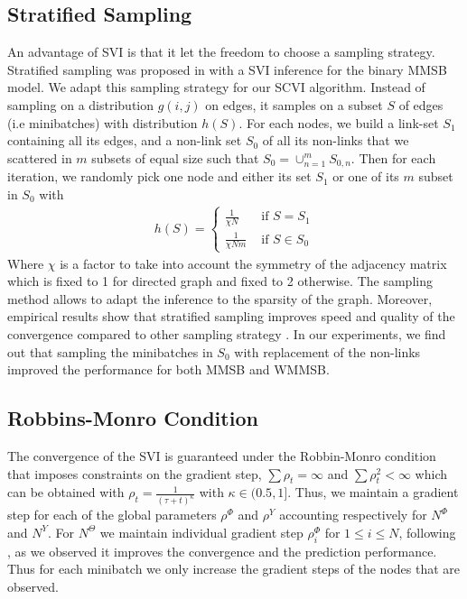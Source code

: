 \subsection{Stratified Sampling}
\label{sec:sampling}

An advantage of SVI is that it let the freedom to choose a sampling strategy. Stratified sampling was proposed in \cite{gopalan2013efficient} with a SVI inference for the binary MMSB model. We adapt this sampling strategy for our SCVI algorithm. Instead of sampling on a distribution $g(i,j)$ on edges, it samples on a subset $S$ of edges (i.e minibatches) with distribution $h(S)$. For each nodes, we build a link-set $S_1$ containing all its edges, and a non-link set $S_0$ of all its non-links that we scattered in $m$ subsets of equal size such that $S_0 = \cup_{n=1}^m S_{0,n}$. Then for each iteration, we randomly pick one node and either its set $S_1$ or one of its $m$ subset in $S_0$ with
\begin{align*}
h(S)=\begin{cases}
    \frac{1}{\chi N}  & \textrm{ if } S = S_1 \\
    \frac{1}{\chi N m}  & \textrm{ if } S \in S_0 
    \end{cases}
\end{align*}
Where $\chi$ is a factor to take into account the symmetry of the adjacency matrix which is fixed to 1 for directed graph and fixed to 2 otherwise. The sampling method allows to adapt the inference to the sparsity of the graph. Moreover, empirical results show that stratified sampling improves speed and quality of the convergence compared to other sampling strategy \cite{gopalan2013efficient}\cite{kim2013efficient}. In our experiments, we find out that sampling the minibatches in $S_0$ with replacement of the non-links improved the performance for both MMSB and WMMSB.

\subsection{Robbins-Monro Condition}

The convergence of the SVI is guaranteed under the Robbin-Monro condition \cite{robbins1951stochastic} that imposes constraints on the gradient step, $\sum \rho_t = \infty$ and $\sum \rho_t^2 < \infty$ which can be obtained with $\rho_t = \frac{1}{(\tau +t)^\kappa}$ with $\kappa \in (0.5, 1]$. Thus, we maintain a gradient step for each of the global parameters $\rho^\Phi$ and $\rho^Y$ accounting respectively for  $N^\Phi$ and $N^Y$. For $N^\Theta$ we maintain individual gradient step $\rho_i^{\Phi}$ for $1\leq i\leq N$, following \cite{miller2009nonparametric}, as we observed it improves the convergence and the prediction performance. Thus for each minibatch we only increase the gradient steps of the nodes that are observed.

